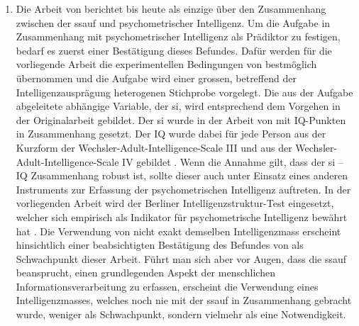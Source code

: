 \documentclass[11pt, twoside, a4paper]{book}		%
\begin{document}
\begin{enumerate}
	\item Die Arbeit von \citet{Melnick2013} berichtet bis heute als einzige über den Zusammenhang zwischen der \gls{ssauf} und psychometrischer Intelligenz. Um die Aufgabe in Zusammenhang mit psychometrischer Intelligenz als Prädiktor zu festigen, bedarf es zuerst einer Bestätigung dieses Befundes. Dafür werden für die vorliegende Arbeit die experimentellen Bedingungen von \citet{Melnick2013} bestmöglich übernommen und die Aufgabe wird einer grossen, betreffend der Intelligenzausprägung heterogenen Stichprobe vorgelegt. Die aus der Aufgabe abgeleitete abhängige Variable, der \gls{si}, wird entsprechend dem Vorgehen in der Originalarbeit gebildet. Der \gls{si} wurde in der Arbeit von \citeauthor{Melnick2013} mit IQ-Punkten in Zusammenhang gesetzt. Der IQ wurde dabei für jede Person aus der Kurzform der Wechsler-Adult-Intelligence-Scale III \citep{Axelrod2002} und aus der Wechsler-Adult-In\-tell\-igence-Scale IV \citep{Wechsler2008} gebildet \citep[siehe Studie 1 und 2 bei][]{Melnick2013}. Wenn die Annahme gilt, dass der \gls{si} -- IQ Zusammenhang robust ist, sollte dieser auch unter Einsatz eines anderen Instruments zur Erfassung der psychometrischen Intelligenz auftreten. In der  vorliegenden Arbeit wird der Berliner Intelligenzstruktur-Test \citep{Jaeger1997} eingesetzt, welcher sich empirisch als Indikator für psychometrische Intelligenz bewährt hat \citep{Beauducel2002, Valerius2014}. Die Verwendung von nicht exakt demselben Intelligenzmass erscheint hinsichtlich einer beabsichtigten Bestätigung des Befundes von \citeauthor{Melnick2013} als Schwachpunkt dieser Arbeit. Führt man sich aber vor Augen, dass die \gls{ssauf} beansprucht, einen grundlegenden Aspekt der menschlichen Informationsverarbeitung zu erfassen, erscheint die Verwendung eines Intelligenzmasses, welches noch nie mit der \gls{ssauf} in Zusammenhang gebracht wurde, weniger als Schwachpunkt, sondern vielmehr als eine Notwendigkeit.


\end{enumerate}
\end{document}
